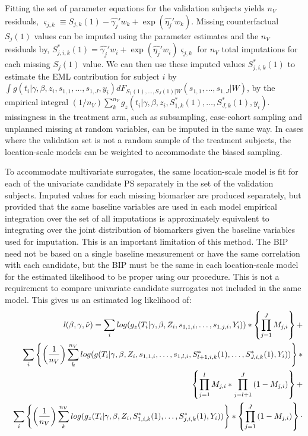 \documentclass[times, doublespace]{simauth}
\begin{document}
Fitting the set of parameter equations for the validation subjects yields $n_V$ residuals, $\varsigma_{j,k} \equiv S_{j,k}(1) - \hat{\gamma_j}'w_{k} + \exp(\hat{\eta_j}'w_{k})$. Missing counterfactual $S_{j}(1)$ values can be imputed using the parameter estimates and the $n_V$ residuals by, $S_{j,i,k}^*(1) = \hat{\gamma_j}'w_{i} + \exp(\hat{\eta_j}'w_{i}) \varsigma_{j,k}$ for $n_V$ total imputations for each missing $S_{j}(1)$ value. We can then use these imputed values $S_{j,i,k}^*(1)$ to estimate the EML contribution for subject $i$ by $\int g(t_i|\gamma, \beta, z_i, s_{1,1}, \ldots, s_{1,J}, y_i)dF_{S_{1}(1),\ldots,S_{J}(1)|W}(s_{1,1},\ldots,s_{1,J}|W)$, by the empirical integral ${\left(1/n_{V}\right)}\sum_k^{n_V}{g_z(t_i|\gamma, \beta,z_i, S_{1,k}^*(1), \ldots,S_{J,k}^*(1),y_i)}$. missingness in the treatment arm, such as subsampling, case-cohort sampling and unplanned missing at random variables, can be imputed in the same way. In cases where the validation set is not a random sample of the treatment subjects, the location-scale models can be weighted to accommodate the biased sampling.  

To accommodate multivariate surrogates, the same location-scale model is fit for each of the univariate candidate PS separately in the set of the validation subjects. Imputed values for each missing biomarker are produced separately, but provided that the same baseline variables are used in each model empirical integration over the set of all imputations is approximately equivalent to integrating over the joint distribution of biomarkers given the baseline variables used for imputation. This is an important limitation of this method. The BIP need not be based on a single baseline measurement or have the same correlation with each candidate, but the BIP must be the same in each location-scale model for the estimated likelihood to be proper using our procedure. This is not a requirement to compare univariate candidate surrogates not included in the same model. This gives us an estimated log likelihood of:
\begin{eqnarray*}
&&\mathit{l}(\beta,\gamma, \hat{\nu})=\sum_{i} log(g_z(T_i|\gamma, \beta,Z_i, s_{1,1,i}, \ldots,s_{1,j,i},Y_i))*\left\{\prod_{j=1}^{J}{M
_{j,i}}\right\}+\\
&&\sum_{i}\left\{\left({1 \over n_{V}}\right)\sum_k^{n_V}{log(g(T_i|\gamma, \beta, Z_i,s_{1,1,i},\ldots, s_{1,l,i}, S^{*}_{l+1,i,k}(1),\ldots, S^{*}_{J,i,k}(1), Y_i))}\right\}*\\
&&\left\{\prod_{j=1}^{l}{M_{j,i}}*\prod_{j=l+1}^{J}{(1-M_{j,i})}\right\}+\\
&&\sum_{i}\left\{\left({1 \over n_{V}}\right)\sum_k^{n_V}{log(g_z(T_i|\gamma, \beta,Z_i, S_{1,i,k}^*(1), \ldots,S_{j,i,k}^*(1),Y_i))}\right\}*\left\{\prod_{j=1}^{J}{(1-M
_{j,i})}\right\}\cdot
\end{eqnarray*}
\end{document}
